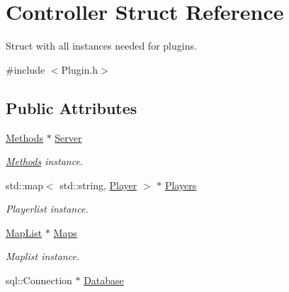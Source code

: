 \hypertarget{structController}{\section{Controller Struct Reference}
\label{structController}
}


Struct with all instances needed for plugins.  




{\ttfamily \#include $<$Plugin.\-h$>$}

\subsection*{Public Attributes}
\begin{DoxyCompactItemize}
\item 
\hypertarget{structController_a768e582ffa588191e09533071ad3a37f}{\hyperlink{classMethods}{Methods} $\ast$ \hyperlink{structController_a768e582ffa588191e09533071ad3a37f}{Server}}\label{structController_a768e582ffa588191e09533071ad3a37f}

\begin{DoxyCompactList}\small\item\em \hyperlink{classMethods}{Methods} instance. \end{DoxyCompactList}\item 
\hypertarget{structController_ad846e355170df1be5bec2c74cc63bc16}{std\-::map$<$ std\-::string, \hyperlink{structPlayer}{Player} $>$ $\ast$ \hyperlink{structController_ad846e355170df1be5bec2c74cc63bc16}{Players}}\label{structController_ad846e355170df1be5bec2c74cc63bc16}

\begin{DoxyCompactList}\small\item\em Playerlist instance. \end{DoxyCompactList}\item 
\hypertarget{structController_ab3ffbfa641bfee42c9440777f194bbb2}{\hyperlink{classMapList}{Map\-List} $\ast$ \hyperlink{structController_ab3ffbfa641bfee42c9440777f194bbb2}{Maps}}\label{structController_ab3ffbfa641bfee42c9440777f194bbb2}

\begin{DoxyCompactList}\small\item\em Maplist instance. \end{DoxyCompactList}\item 
\hypertarget{structController_a4dd102e10587534a986cd511544e93db}{sql\-::\-Connection $\ast$ \hyperlink{structController_a4dd102e10587534a986cd511544e93db}{Database}}\label{structController_a4dd102e10587534a986cd511544e93db}


\end{DoxyCompactItemize}
